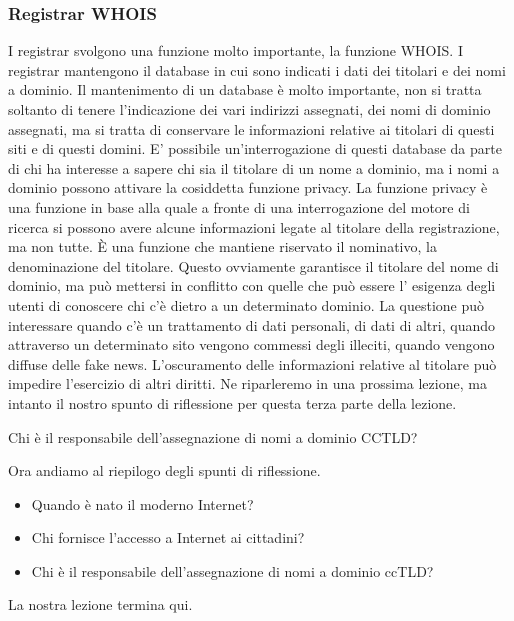 \subsubsection{Registrar WHOIS}
I registrar svolgono una funzione molto importante, la funzione WHOIS. I registrar mantengono il database in cui sono indicati i dati dei titolari e dei nomi a dominio. Il mantenimento di un database è molto importante, non si tratta soltanto di tenere l'indicazione dei vari indirizzi assegnati, dei nomi di dominio assegnati, ma si tratta di conservare le informazioni relative ai titolari di questi siti e di questi domini. E' possibile un'interrogazione di questi database da parte di chi ha interesse a sapere chi sia il titolare di un nome a dominio, ma i nomi a dominio possono attivare la cosiddetta funzione privacy. La funzione privacy è una funzione in base alla quale a fronte di una interrogazione del motore di ricerca si possono avere alcune informazioni legate al titolare della registrazione, ma non tutte. È una funzione che mantiene riservato il nominativo, la denominazione del titolare. Questo ovviamente garantisce il titolare del nome di dominio, ma può mettersi in conflitto con quelle che può essere l' esigenza degli utenti di conoscere chi c'è dietro a un determinato dominio. La questione può interessare quando c'è un trattamento di dati personali, di dati di altri, quando attraverso un determinato sito vengono commessi degli illeciti, quando vengono diffuse delle fake news. L'oscuramento delle informazioni relative al titolare può impedire l'esercizio di altri diritti. Ne riparleremo in una prossima lezione, ma intanto il nostro spunto di riflessione per questa terza parte della lezione.\par
Chi è il responsabile dell'assegnazione di nomi a dominio CCTLD? \par
Ora andiamo al riepilogo degli spunti di riflessione.

\begin{itemize}
    \item Quando è nato il moderno Internet?
    \item Chi fornisce l'accesso a Internet ai cittadini?
    \item Chi è il responsabile dell'assegnazione di nomi a dominio ccTLD?

\end{itemize}
La nostra lezione termina qui.